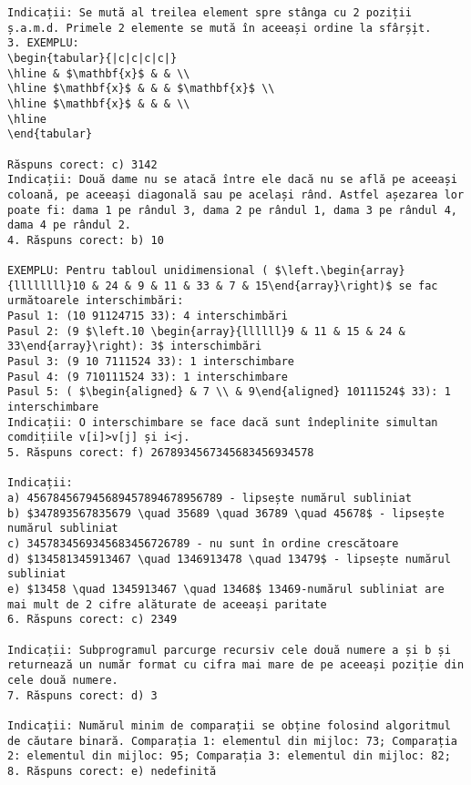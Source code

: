 \begin{verbatim}
Indicații: Se mută al treilea element spre stânga cu 2 poziții ș.a.m.d. Primele 2 elemente se mută în aceeași ordine la sfârș̦it.
3. EXEMPLU:
\begin{tabular}{|c|c|c|c|}
\hline & $\mathbf{x}$ & & \\
\hline $\mathbf{x}$ & & & $\mathbf{x}$ \\
\hline $\mathbf{x}$ & & & \\
\hline
\end{tabular}

Răspuns corect: c) 3142
Indicații: Două dame nu se atacă între ele dacă nu se află pe aceeași coloană, pe aceeași diagonală sau pe același rând. Astfel așezarea lor poate fi: dama 1 pe rândul 3, dama 2 pe rândul 1, dama 3 pe rândul 4, dama 4 pe rândul 2.
4. Răspuns corect: b) 10

EXEMPLU: Pentru tabloul unidimensional ( $\left.\begin{array}{llllllll}10 & 24 & 9 & 11 & 33 & 7 & 15\end{array}\right)$ se fac următoarele interschimbări:
Pasul 1: (10 91124715 33): 4 interschimbări
Pasul 2: (9 $\left.10 \begin{array}{llllll}9 & 11 & 15 & 24 & 33\end{array}\right): 3$ interschimbări
Pasul 3: (9 10 7111524 33): 1 interschimbare
Pasul 4: (9 710111524 33): 1 interschimbare
Pasul 5: ( $\begin{aligned} & 7 \\ & 9\end{aligned} 10111524$ 33): 1 interschimbare
Indicații: O interschimbare se face dacă sunt îndeplinite simultan comdițiile v[i]>v[j] și i<j.
5. Răspuns corect: f) 2678934567345683456934578

Indicații:
a) 456784567945689457894678956789 - lipsește numărul subliniat
b) $347893567835679 \quad 35689 \quad 36789 \quad 45678$ - lipsește numărul subliniat
c) 3457834569345683456726789 - nu sunt în ordine crescătoare
d) $134581345913467 \quad 1346913478 \quad 13479$ - lipsește numărul subliniat
e) $13458 \quad 1345913467 \quad 13468$ 13469-numărul subliniat are mai mult de 2 cifre alăturate de aceeași paritate
6. Răspuns corect: c) 2349

Indicații: Subprogramul parcurge recursiv cele două numere a și b și returnează un număr format cu cifra mai mare de pe aceeași poziție din cele două numere.
7. Răspuns corect: d) 3

Indicații: Numărul minim de comparații se obține folosind algoritmul de căutare binară. Comparația 1: elementul din mijloc: 73; Comparația 2: elementul din mijloc: 95; Comparația 3: elementul din mijloc: 82;
8. Răspuns corect: e) nedefinită


\end{verbatim}
